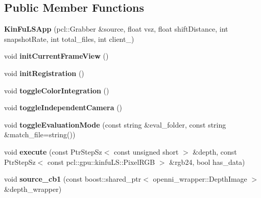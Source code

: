 \subsection*{Public Member Functions}
\begin{DoxyCompactItemize}
\item 
\hypertarget{struct_kin_fu_l_s_app_aaea571898fcf4c7e47c88fea1c994d17}{{\bfseries Kin\+Fu\+L\+S\+App} (pcl\+::\+Grabber \&source, float vsz, float shift\+Distance, int snapshot\+Rate, int total\+\_\+files, int client\+\_\+)}\label{struct_kin_fu_l_s_app_aaea571898fcf4c7e47c88fea1c994d17}

\item 
\hypertarget{struct_kin_fu_l_s_app_a6963b65f27821eaf0b5bf0d8a2ac7720}{void {\bfseries init\+Current\+Frame\+View} ()}\label{struct_kin_fu_l_s_app_a6963b65f27821eaf0b5bf0d8a2ac7720}

\item 
\hypertarget{struct_kin_fu_l_s_app_a004af16f409ebe1bc23cbdd626ee7aba}{void {\bfseries init\+Registration} ()}\label{struct_kin_fu_l_s_app_a004af16f409ebe1bc23cbdd626ee7aba}

\item 
\hypertarget{struct_kin_fu_l_s_app_a6037c71fb3ac44b92a271b64e39dc697}{void {\bfseries toggle\+Color\+Integration} ()}\label{struct_kin_fu_l_s_app_a6037c71fb3ac44b92a271b64e39dc697}

\item 
\hypertarget{struct_kin_fu_l_s_app_aa11b87b7264e0c48b1e1ae1ba617945b}{void {\bfseries toggle\+Independent\+Camera} ()}\label{struct_kin_fu_l_s_app_aa11b87b7264e0c48b1e1ae1ba617945b}

\item 
\hypertarget{struct_kin_fu_l_s_app_aeaa9e6019064691acc6d454592b93c6a}{void {\bfseries toggle\+Evaluation\+Mode} (const string \&eval\+\_\+folder, const string \&match\+\_\+file=string())}\label{struct_kin_fu_l_s_app_aeaa9e6019064691acc6d454592b93c6a}

\item 
\hypertarget{struct_kin_fu_l_s_app_aa2cfc273af83e335934865aec9069892}{void {\bfseries execute} (const Ptr\+Step\+Sz$<$ const unsigned short $>$ \&depth, const Ptr\+Step\+Sz$<$ const pcl\+::gpu\+::kinfu\+L\+S\+::\+Pixel\+R\+G\+B $>$ \&rgb24, bool has\+\_\+data)}\label{struct_kin_fu_l_s_app_aa2cfc273af83e335934865aec9069892}

\item 
\hypertarget{struct_kin_fu_l_s_app_ad99e2511986abfa28694967478457f90}{void {\bfseries source\+\_\+cb1} (const boost\+::shared\+\_\+ptr$<$ openni\+\_\+wrapper\+::\+Depth\+Image $>$ \&depth\+\_\+wrapper)}\label{struct_kin_fu_l_s_app_ad99e2511986abfa28694967478457f90}


\end{DoxyCompactItemize}
